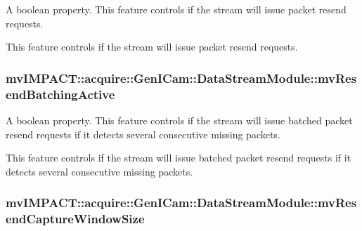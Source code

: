 A boolean property. This feature controls if the stream will issue packet resend requests. 

This feature controls if the stream will issue packet resend requests. \hypertarget{classmv_i_m_p_a_c_t_1_1acquire_1_1_gen_i_cam_1_1_data_stream_module_a363a6f5efc816a87ce1b9fac3548e69f}{
\subsubsection[{mv\+Resend\+Batching\+Active}]{ mv\+I\+M\+P\+A\+C\+T\+::acquire\+::\+Gen\+I\+Cam\+::\+Data\+Stream\+Module\+::mv\+Resend\+Batching\+Active}}\label{classmv_i_m_p_a_c_t_1_1acquire_1_1_gen_i_cam_1_1_data_stream_module_a363a6f5efc816a87ce1b9fac3548e69f}


A boolean property. This feature controls if the stream will issue batched packet resend requests if it detects several consecutive missing packets. 

This feature controls if the stream will issue batched packet resend requests if it detects several consecutive missing packets. \hypertarget{classmv_i_m_p_a_c_t_1_1acquire_1_1_gen_i_cam_1_1_data_stream_module_a99ef2f34ba6cab3607cd73a393ac30ae}{
\subsubsection[{mv\+Resend\+Capture\+Window\+Size}]{ mv\+I\+M\+P\+A\+C\+T\+::acquire\+::\+Gen\+I\+Cam\+::\+Data\+Stream\+Module\+::mv\+Resend\+Capture\+Window\+Size}}\label{classmv_i_m_p_a_c_t_1_1acquire_1_1_gen_i_cam_1_1_data_stream_module_a99ef2f34ba6cab3607cd73a393ac30ae}


